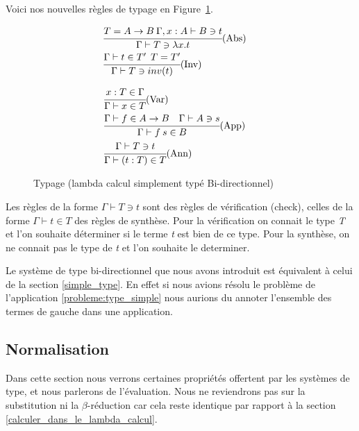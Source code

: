 \documentclass {article}
\theoremstyle{definition}
\theoremstyle{remark}
\begin{document}
Voici nos nouvelles règles de typage en Figure~\ref{fig:typage-simple-bi-direct}.

\begin{figure}
\label{regles typage bidirectionnel}
\center{}

\begin{align*}
  &\cfrac{T = A \rightarrow B \: \Gamma, x:A \vdash B \ni t}
  {\Gamma \vdash T \ni \lambda x. t}\mbox{(Abs)}&\: \\
  &\cfrac{\Gamma \vdash t \in T' \:\: T=T'}
  {\Gamma\vdash T \ni inv(t)}\mbox{(Inv)} \\
\end{align*}

\center{}

\begin{align*}
  &\cfrac{x:T \in \Gamma}
  {\Gamma \vdash x \in T }\mbox{(Var)}&\: \\
  &\cfrac{\Gamma \vdash f \in A\rightarrow B \quad \Gamma\vdash A \ni s }
  {\Gamma\vdash f\:s\in B}\mbox{(App)} \\
  &\cfrac{\Gamma\vdash T \ni t}
    {\Gamma\vdash (t:T) \in T}\mbox{(Ann)} \\
\end{align*}

\caption{Typage (lambda calcul simplement typé Bi-directionnel)}
\label{fig:typage-simple-bi-direct} 
\end{figure}   


Les règles de la forme \(\Gamma\vdash T \ni t\) sont des règles de vérification (check),
celles de la forme \(\Gamma\vdash t \in T\) des règles de synthèse.
Pour la vérification on connait le type \emph{T} et l'on souhaite déterminer si le terme \emph{t}
est bien de ce type. Pour la synthèse, on ne connait pas le type de \emph{t} et l'on souhaite le
determiner.

Le système de type bi-directionnel que nous avons introduit est équivalent à celui de la section \ref{simple_type}.
En effet si nous avions résolu le problème de l'application \ref{probleme:type_simple} nous aurions du annoter 
l'ensemble des termes de gauche dans une application.

\subsection{Normalisation} %

Dans cette section nous verrons certaines propriétés offertent par les systèmes de type, et nous parlerons 
de l'évaluation. Nous ne reviendrons pas sur la substitution ni la $\beta$-réduction car cela reste identique par 
rapport à la section \ref{calculer_dans_le_lambda_calcul}.
\end{document}
